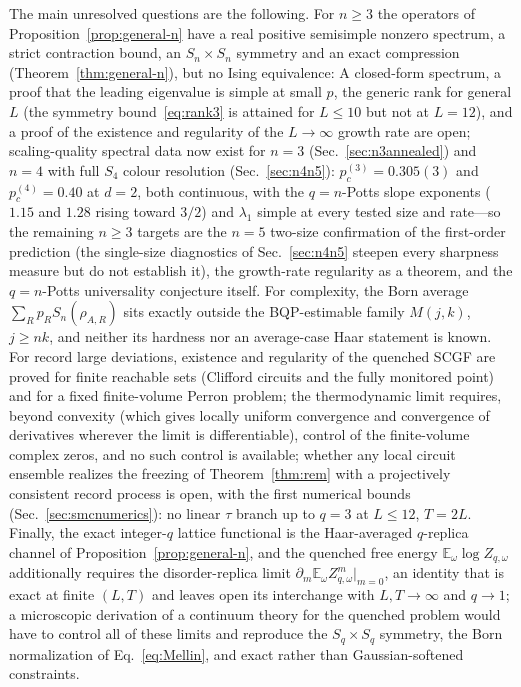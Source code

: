 \documentclass[aps,prx,reprint,superscriptaddress,nobibnotes,longbibliography]{revtex4-2}
\theoremstyle{remark}
\newcommand{\E}{\mathbb E}
\begin{document}
The main unresolved questions are the following.  For $n\ge3$ the operators of Proposition~\ref{prop:general-n} have a real positive semisimple nonzero spectrum, a strict contraction bound, an $S_n\times S_n$ symmetry and an exact compression (Theorem~\ref{thm:general-n}), but no Ising equivalence: A closed-form spectrum, a proof that the leading eigenvalue is simple at small $p$, the generic rank for general $L$ (the symmetry bound~\eqref{eq:rank3} is attained for $L\le10$ but not at $L=12$), and a proof of the existence and regularity of the $L\to\infty$ growth rate are open; scaling-quality spectral data now exist for $n=3$ (Sec.~\ref{sec:n3annealed}) and $n=4$ with full $S_4$ colour resolution (Sec.~\ref{sec:n4n5}): $p_c^{(3)}=0.305(3)$ and $p_c^{(4)}=0.40$ at $d=2$, both continuous, with the $q=n$-Potts slope exponents ($1.15$ and $1.28$ rising toward $3/2$) and $\lambda_1$ simple at every tested size and rate—so the remaining $n\ge3$ targets are the $n=5$ two-size confirmation of the first-order prediction (the single-size diagnostics of Sec.~\ref{sec:n4n5} steepen every sharpness measure but do not establish it), the growth-rate regularity as a theorem, and the $q=n$-Potts universality conjecture itself.  For complexity, the Born average $\sum_Rp_RS_n(\rho_{A,R})$ sits exactly outside the BQP-estimable family $M(j,k)$, $j\ge nk$, and neither its hardness nor an average-case Haar statement is known.  For record large deviations, existence and regularity of the quenched SCGF are proved for finite reachable sets (Clifford circuits and the fully monitored point) and for a fixed finite-volume Perron problem; the thermodynamic limit requires, beyond convexity (which gives locally uniform convergence and convergence of derivatives wherever the limit is differentiable), control of the finite-volume complex zeros, and no such control is available; whether any local circuit ensemble realizes the freezing of Theorem~\ref{thm:rem} with a projectively consistent record process is open, with the first numerical bounds (Sec.~\ref{sec:smcnumerics}): no linear $\tau$ branch up to $q=3$ at $L\le12$, $T=2L$.  Finally, the exact integer-$q$ lattice functional is the Haar-averaged $q$-replica channel of Proposition~\ref{prop:general-n}, and the quenched free energy $\E_\omega\log Z_{q,\omega}$ additionally requires the disorder-replica limit $\partial_m\E_\omega Z_{q,\omega}^m|_{m=0}$, an identity that is exact at finite $(L,T)$ and leaves open its interchange with $L,T\to\infty$ and $q\to1$; a microscopic derivation of a continuum theory for the quenched problem would have to control all of these limits and reproduce the $S_q\times S_q$ symmetry, the Born normalization of Eq.~\eqref{eq:Mellin}, and exact rather than Gaussian-softened constraints.
\end{document}
